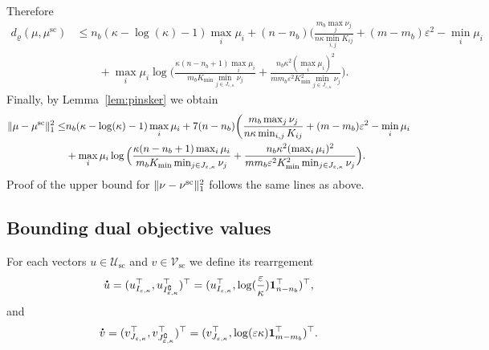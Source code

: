 Therefore
\begin{align*}
d_\varrho({\mu},{\mu}^{\text{sc}}) &\leq n_b(\kappa-\log(\kappa)-1)\max_{i} \mu_i + (n-n_b)\bigg(\frac{m_b\max_{j}\nu_j}{n\kappa\min_{i,j} K_{ij}} + (m- m_b) \varepsilon^2 - \min_{i}\mu_i\\
&\qquad + \max_{i} \mu_i\log\Big(\frac{\kappa(n-n_b+ 1)\max_{i} \mu_i}{m_bK_{\min}\min_{j \in J_{\varepsilon,\kappa}}\nu_j} + \frac{n_b\kappa^2(\max_{i} \mu_i)^2}{mm_b\varepsilon^2 K_{\min}^2\min_{j \in J_{\varepsilon,\kappa}}\nu_j}\Big).
\end{align*}
Finally, by Lemma~\ref{lem:pinsker} we obtain
\begin{align*}
\norm{{\mu} -{\mu}^{\text{sc}}}^2_1 \leq & n_b(\kappa-\log(\kappa)-1)\max_{i} \mu_i + 7(n-n_b)\bigg(\frac{m_b\max_{j}\nu_j}{n\kappa\min_{i,j} K_{ij}} + (m- m_b) \varepsilon^2 - \min_{i}\mu_i\\
&+ \max_{i} \mu_i\log\Big(\frac{\kappa(n-n_b+ 1)\max_{i} \mu_i}{m_bK_{\min}\min_{j \in J_{\varepsilon,\kappa}}\nu_j} + \frac{n_b\kappa^2(\max_{i} \mu_i)^2}{mm_b\varepsilon^2K_{\min}^2\min_{j \in J_{\varepsilon,\kappa}}\nu_j}\Big).%
\end{align*}
Proof of the upper bound for $\|\nu - {\nu}^{\text{sc}}\|^2_1$ follows the same lines as above.



\subsection{Bounding dual objective values}

For each vectors $u \in \mathcal{U}_{\text{sc}}$ and $v\in \mathcal{V}_{\text{sc}}$ we define its rearrgement 
\begin{equation*}
\dt{u} =(u_{I_{\varepsilon,\kappa}}^\top, u_{I^\complement_{\varepsilon,\kappa}}^\top)^\top = (u_{I_{\varepsilon,\kappa}}^\top, \log(\frac\varepsilon\kappa)\mathbf1_{n- n_b}^\top)^\top,
\end{equation*}
and 
\begin{equation*}
\dt{v} =(v_{J_{\varepsilon,\kappa}}^\top, v_{J^\complement_{\varepsilon,\kappa}}^\top)^\top = (v_{J_{\varepsilon,\kappa}}^\top, \log(\varepsilon\kappa)\mathbf 1_{m- m_b}^\top)^\top.
\end{equation*}


